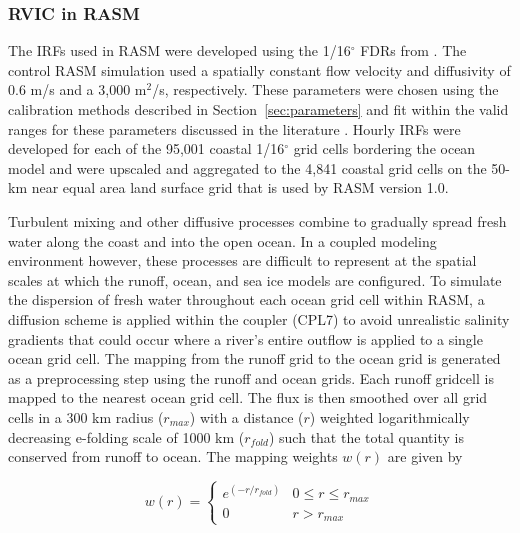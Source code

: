 \documentclass[jgrga, draft]{agutex}
\begin{document}
\begin{article}
\subsubsection{RVIC in RASM}

The IRFs used in RASM were developed using the 1/16$^{\circ}$ FDRs from \citet{Wu_2011}.
The control RASM simulation used a spatially constant flow velocity and diffusivity of 0.6 m/s and a 3,000 m$^2$/s, respectively. %
These parameters were chosen using the calibration methods described in Section~\ref{sec:parameters} and fit within the valid ranges for these parameters discussed in the literature \citep[e.g.][]{Decharme_2010,Lohmann_1996}.
Hourly IRFs were developed for each of the 95,001 coastal 1/16$^{\circ}$ grid cells bordering the ocean model and were upscaled and aggregated to the 4,841 coastal grid cells on the 50-km near equal area land surface grid that is used by RASM version 1.0.

Turbulent mixing and other diffusive processes combine to gradually spread fresh water along the coast and into the open ocean. %
In a coupled modeling environment however, these processes are difficult to represent at the spatial scales at which the runoff, ocean, and sea ice models are configured.
To simulate the dispersion of fresh water throughout each ocean grid cell within RASM, a diffusion scheme is applied within the coupler (CPL7) to avoid unrealistic salinity gradients that could occur where a river's entire outflow is applied to a single ocean grid cell.
The mapping from the runoff grid to the ocean grid is generated as a preprocessing step using the runoff and ocean grids.
Each runoff gridcell is mapped to the nearest ocean grid cell.
The flux is then smoothed over all grid cells in a 300 km radius ($r_{max}$) with a distance ($r$) weighted logarithmically decreasing e-folding scale of 1000 km ($r_{fold}$) such that the total quantity is conserved from runoff to ocean. %
The mapping weights $w(r)$ are given by

\begin{equation}
  \label{eq:diffusion}
  w(r)=
     \begin{cases}
        e^{(-r/r_{fold})} & 0\leq r\leq r_{max} \\
        0 & r > r_{max}
     \end{cases}
\end{equation}


\end{article}
\end{document}
